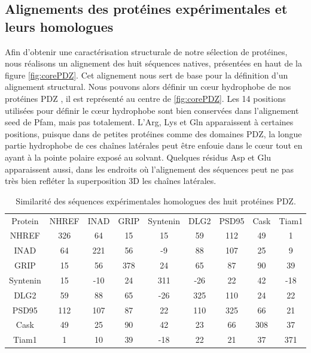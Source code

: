 \subsection{Alignements des protéines expérimentales et leurs homologues}

Afin d'obtenir une caractérisation structurale de notre sélection de protéines, nous réalisons un alignement des huit séquences natives, présentées en haut de la figure \ref{fig:corePDZ}. Cet alignement nous sert de base pour la définition d'un alignement structural. Nous pouvons alors définir un cœur hydrophobe de nos protéines \og PDZ \fg , il est représenté au centre de \ref{fig:corePDZ}. Les 14 positions utilisées pour définir le cœur hydrophobe sont bien conservées dans l'alignement \og seed \fg de Pfam, mais pas totalement. L'Arg, Lys et Gln apparaissent à certaines positions, puisque dans de petites protéines comme des domaines PDZ, la longue partie hydrophobe de ces chaînes latérales peut être enfouie dans le cœur tout en ayant à la pointe polaire exposé au solvant. Quelques résidus Asp et Glu apparaissent aussi, dans les endroits où l'alignement des séquences peut ne pas très bien refléter la superposition 3D les chaînes latérales.

    \begin{table}[!htbp]
      \centering
      \caption{Similarité des séquences expérimentales homologues des huit protéines PDZ.}
      \begin{tabular}{ccccccccc}
        \toprule
        Protein & NHREF        & INAD      & GRIP        & Syntenin        & DLG2       & PSD95       & Cask       & Tiam1 \\
        \cmidrule{1-9}

        NHREF    & 326 &  64 &  15 &  15 &  59 & 112 & 49  &   1  \\     
        INAD    &  64 & 221 &  56 &  -9 &  88 & 107 & 25  &   9  \\
        GRIP    &  15 &  56 & 378 &  24 &  65 &  87 & 90  &  39  \\
        Syntenin    &  15 & -10 &  24 & 311 & -26 &  22 & 42  & -18  \\
        DLG2    &  59 &  88 &  65 & -26 & 325 & 110 & 24  &  22  \\
        PSD95    & 112 & 107 &  87 &  22 & 110 & 325 & 66  &  21  \\
        Cask    &  49 &  25 &  90 &  42 &  23 &  66 & 308 & 37   \\
        Tiam1   &  1  &  10 &  39 & -18 &  22 &  21 & 37  & 371 \\
        \bottomrule
      \end{tabular} 
\label{tab:Xsimil}      
    \end{table}


